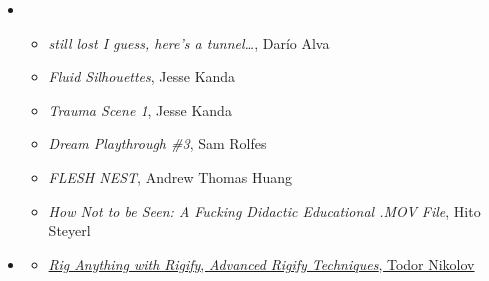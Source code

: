 \begin{itemize}[noitemsep,topsep=0pt,leftmargin=*]
    \item {}
          \begin{itemize}
              \item \emph{still lost I guess, here’s a tunnel\dots}, Darío Alva
              \item \emph{Fluid Silhouettes}, Jesse Kanda
              \item \emph{Trauma Scene 1}, Jesse Kanda
              \item \emph{Dream Playthrough \#3}, Sam Rolfes
              \item \emph{FLESH NEST}, Andrew Thomas Huang
              \item \emph{How Not to be Seen: A Fucking Didactic Educational .MOV File}, Hito Steyerl
          \end{itemize}
    \item {}
          \begin{resenv}
              \begin{itemize}
                  \item \href{https://www.youtube.com/playlist?list=PLdcL5aF8ZcJv68SSdwxip33M7snakl6Dx}{\emph{Rig Anything with Rigify}, \emph{\href{https://www.youtube.com/playlist?list=PLdcL5aF8ZcJttvb-rgvyA1NkRi77zVP-J}{Advanced Rigify Techniques}}, Todor Nikolov }
              \end{itemize}
          \end{resenv}
\end{itemize}